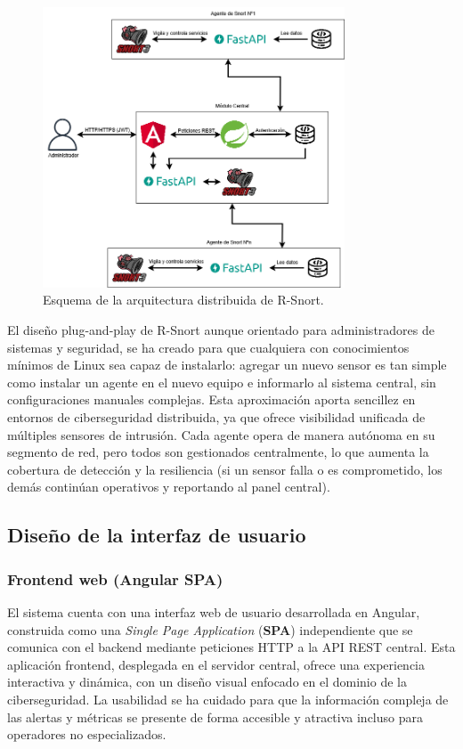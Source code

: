 \documentclass[11pt,a4paper,twoside]{report}
\begin{document}
\begin{figure}[h!]
	\includegraphics[width=0.8\textwidth]{documento/6.png}
	\caption{Esquema de la arquitectura distribuida de R-Snort.}
	\label{fig:arquitectura}
\end{figure}

El diseño plug-and-play de R-Snort aunque orientado para administradores de sistemas y seguridad, se ha creado para que cualquiera con conocimientos mínimos de Linux sea capaz de instalarlo: agregar un nuevo sensor es tan simple como instalar un agente en el nuevo equipo e informarlo al sistema central, sin configuraciones manuales complejas. Esta aproximación aporta sencillez en entornos de ciberseguridad distribuida, ya que ofrece visibilidad unificada de múltiples sensores de intrusión. Cada agente opera de manera autónoma en su segmento de red, pero todos son gestionados centralmente, lo que aumenta la cobertura de detección y la resiliencia (si un sensor falla o es comprometido, los demás continúan operativos y reportando al panel central).

\subsection{Diseño de la interfaz de usuario}

\subsubsection{Frontend web (Angular SPA)}

El sistema cuenta con una interfaz web de usuario desarrollada en Angular, construida como una \emph{Single Page Application} (\textbf{SPA}) independiente que se comunica con el backend mediante peticiones HTTP a la API REST central. Esta aplicación frontend, desplegada en el servidor central, ofrece una experiencia interactiva y dinámica, con un diseño visual enfocado en el dominio de la ciberseguridad. La usabilidad se ha cuidado para que la información compleja de las alertas y métricas se presente de forma accesible y atractiva incluso para operadores no especializados.\newline
\end{document}

